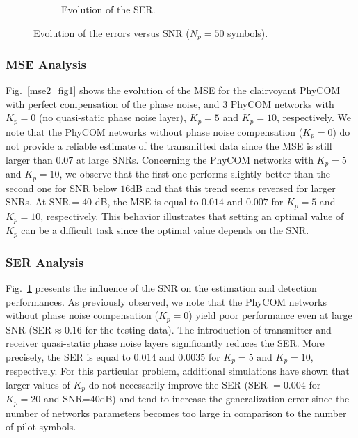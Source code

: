 \documentclass{article}
\begin{document}
\begin{figure}[!t]
\begin{subfigure}{.48\textwidth}
\caption{Evolution of the SER.}\label{mse2_fig2}
\end{subfigure}
\caption{Evolution of the errors versus SNR ($N_p=50$ symbols).}\label{ser2fig}
\end{figure}


\subsubsection{MSE Analysis}

Fig.~\ref{mse2_fig1} shows the evolution of the MSE for the clairvoyant PhyCOM with perfect compensation of the phase noise, and 3 PhyCOM networks with $K_p=0$ (no quasi-static phase noise layer), $K_p=5$ and $K_p=10$, respectively. We note that the PhyCOM networks without phase noise compensation ($K_p=0$) do not provide a reliable estimate of the transmitted data since the MSE is still larger than $0.07$ at large SNRs. Concerning the PhyCOM networks with $K_p=5$ and $K_p=10$, we observe that the first one performs slightly better than the second one for SNR below $16$dB and that this trend seems reversed for larger SNRs. At SNR$=40$ dB, the MSE is equal to $0.014$ and $0.007$ for $K_p=5$ and $K_p=10$, respectively. This behavior illustrates that setting an optimal value of $K_p$ can be a difficult task since the optimal value depends on the SNR.

\subsubsection{SER Analysis}

Fig.~\ref{mse2_fig2} presents the influence of the SNR on the estimation and detection performances. As previously observed, we note that the PhyCOM networks without phase noise compensation ($K_p=0$) yield poor performance even at large SNR (SER$\approx0.16$ for the testing data). The introduction of transmitter and receiver quasi-static phase noise layers significantly reduces the SER. More precisely, the SER is equal to $0.014$ and $0.0035$ for $K_p=5$ and $K_p=10$, respectively. For this particular problem, additional simulations have shown that larger values of $K_p$ do not necessarily improve the SER (SER $=0.004$ for $K_p=20$ and SNR=$40$dB) and tend to increase the generalization error since the number of networks parameters becomes too large in comparison to the number of pilot symbols.
\end{document}
